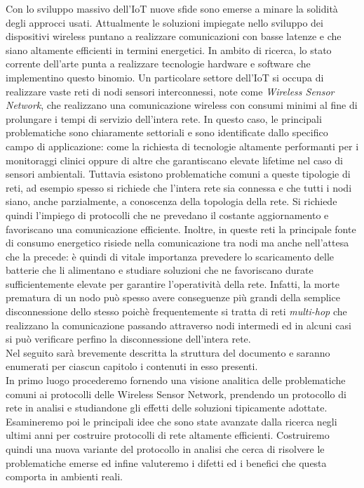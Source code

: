 \documentclass[binding=0.6cm,TFA]{sapthesis}
\begin{document}
Con lo sviluppo massivo dell'IoT nuove sfide sono emerse a minare la solidità degli approcci usati. Attualmente le soluzioni impiegate nello sviluppo
dei dispositivi wireless puntano a realizzare comunicazioni con basse latenze e che siano altamente efficienti in termini energetici. In ambito di ricerca,
lo stato corrente dell'arte punta a realizzare tecnologie hardware e software che implementino questo binomio. Un particolare
settore dell'IoT si occupa di realizzare vaste reti di nodi sensori interconnessi, note come \emph{Wireless Sensor Network},
che realizzano una comunicazione wireless con consumi minimi al fine di prolungare i tempi di servizio dell'intera rete. In questo caso,
le principali problematiche sono chiaramente settoriali e sono identificate dallo specifico campo di applicazione: come la richiesta di tecnologie
altamente performanti per i monitoraggi clinici oppure di altre che garantiscano elevate lifetime nel caso di sensori ambientali. Tuttavia esistono
problematiche comuni a queste tipologie di reti, ad esempio spesso si richiede che l'intera rete sia connessa e che tutti i nodi siano,
anche parzialmente, a conoscenza della topologia della rete. Si richiede quindi l'impiego di protocolli che ne prevedano il
costante aggiornamento e favoriscano una comunicazione efficiente. Inoltre, in queste reti la principale fonte di consumo energetico risiede
nella comunicazione tra nodi ma anche nell'attesa che la precede: è quindi di vitale importanza prevedere lo scaricamento delle batterie che li alimentano
e studiare soluzioni che ne favoriscano durate sufficientemente elevate per garantire l'operatività della rete. Infatti, la morte prematura di un nodo
può spesso avere conseguenze più grandi della semplice disconnessione dello stesso poichè frequentemente si tratta di reti \emph{multi-hop} che
realizzano la comunicazione passando attraverso nodi intermedi ed in alcuni casi si può verificare perfino la disconnessione dell'intera rete.\\

Nel seguito sarà brevemente descritta la struttura del documento e saranno enumerati per ciascun capitolo i contenuti in esso presenti.\\

In primo luogo procederemo fornendo una visione analitica delle problematiche comuni ai protocolli delle Wireless Sensor
Network, prendendo un protocollo di rete in analisi e studiandone gli effetti delle soluzioni tipicamente adottate. Esamineremo poi le principali
idee che sono state avanzate dalla ricerca negli ultimi anni per costruire protocolli di rete altamente efficienti. Costruiremo quindi una nuova variante
del protocollo in analisi che cerca di risolvere le problematiche emerse ed infine valuteremo i difetti ed i benefici che questa comporta in ambienti reali.\\
\end{document}
